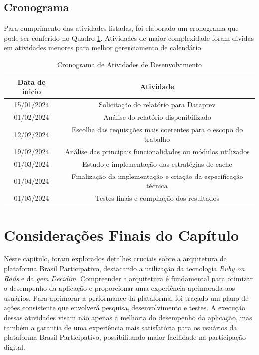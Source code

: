 \subsection{Cronograma}

Para cumprimento das atividades listadas, foi elaborado um cronograma que pode ser conferido no Quadro \ref{tab:cronograma-tcc2}. Atividades de maior complexidade foram dividas em atividades menores para melhor gerenciamento de calendário.

\begin{table}
  \centering
  \caption{Cronograma de Atividades de Desenvolvimento}
  \label{tab:cronograma-tcc2}
  \begin{tabular}{|c|c|}
    \hline
    Data de inicio & Atividade \\
    \hline
    15/01/2024 & Solicitação do relatório para Dataprev \\
    01/02/2024 & Análise do relatório disponibilizado \\
    12/02/2024 & Escolha das requisições mais coerentes para o escopo do trabalho \\
    19/02/2024 & Análise das principais funcionalidades ou módulos utilizados \\
    01/03/2024 & Estudo e implementação das estratégias de cache \\
    01/04/2024 & Finalização da implementação e criação da especificação técnica \\
    01/05/2024 & Testes finais e compilação dos resultados \\
    \hline
  \end{tabular}
\end{table}

\section{Considerações Finais do Capítulo}

Neste capítulo, foram explorados detalhes cruciais sobre a arquitetura da plataforma Brasil Participativo, destacando a utilização da tecnologia \textit{Ruby on Rails} e da \textit{gem Decidim}. Compreender a arquitetura é fundamental para otimizar o desempenho da aplicação e proporcionar uma experiência aprimorada aos usuários. Para aprimorar a performance da plataforma, foi traçado um plano de ações consistente que envolverá pesquisa, desenvolvimento e testes. A execução dessas atividades visam não apenas a melhoria do desempenho da aplicação, mas também a garantia de uma experiência mais satisfatória para os usuários da plataforma Brasil Participativo, possibilitando maior facilidade na participação digital.